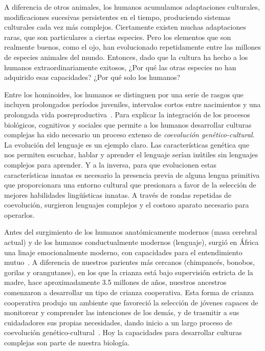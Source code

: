 \documentclass[a4paper,11pt]{book}
\theoremstyle{definition}
\begin{document}

A diferencia de otros animales, los humanos acumulamos adaptaciones culturales, modificaciones sucesivas persistentes en el tiempo, produciendo sistemas culturales cada vez más complejos.
%
Ciertamente existen muchas adaptaciones raras, que son particulares a ciertas especies.
%
Pero los elementos que son realmente buenos, como el ojo, han evolucionado repetidamente entre las millones de especies animales del mundo.
%
Entonces, dado que la cultura ha hecho a los humanos extraordinariamente exitosos, ¿Por qué las otras especies no han adquirido esas capacidades?
%
¿Por qué solo los humanos?


Entre los hominoides, los humanos se distinguen por una serie de rasgos que incluyen prolongados períodos juveniles, intervalos cortos entre nacimientos y una prolongada vida posreproductiva~\cite{Jones2011}.
%
Para explicar la integraci\'on de los procesos biol\'ogicos, cognitivos y sociales que permite a los humanos desarrollar culturas complejas ha sido necesario un proceso extenso de \emph{coevoluci\'on gen\'etico-cultural}.
%
%
La evolución del lenguaje es un ejemplo claro.
%
Las características genética que nos permiten escuchar, hablar y aprender el lenguaje serían inútiles sin lenguajes complejos para aprender.
%
Y a la inversa, para que evolucionen estas características innatas es necesario la presencia previa de alguna lengua primitiva que proporcionara una entorno cultural que presionara a favor de la selección de mejores habilidades lingüísticas innatas.
%
A través de rondas repetidas de coevolución, surgieron lenguajes complejos y el costoso aparato necesario para operarlos.


Antes del surgimiento de los humanos anat\'omicamente modernos (masa cerebral actual) y de los humanos conductualmente modernos (lenguaje), surgi\'o en África una linaje emocionalmente moderno, con capacidades para el entendimiento mutuo~\cite{hrdy2020-emotionallyModern}.
%
A diferencia de nuestros parientes m\'as cercanos (chimpanc\'es, bonobos, gorilas y orangutanes), en los que la crianza está bajo supervisión estricta de la madre, hace aproximadamente 3.5 millones de años, nuestros ancestros comenzaron a desarrollar un tipo de crianza cooperativa.
%
Esta forma de crianza cooperativa produjo un ambiente que favoreci\'o la selecci\'on de j\'ovenes capaces de monitorear y comprender las intenciones de los dem\'as, y de trasmitir a sus cuidadadores sus propias necesidades, dando inicio a un largo proceso de coevoluci\'on gen\'etico-cultural~\cite{hrdy2020-emotionallyModern}.
%
Hoy la capacidades para desarrollar culturas complejas son parte de nuestra biología.
\end{document}
